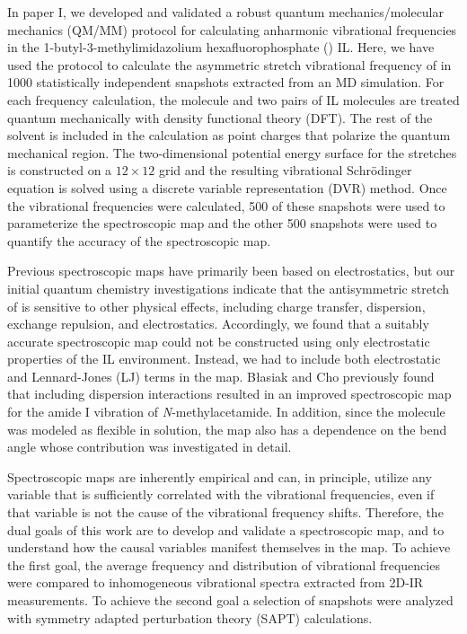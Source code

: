 In paper I\cite{PaperI}, we developed and validated a robust quantum mechanics/molecular mechanics (QM/MM) protocol for calculating anharmonic  vibrational frequencies in the 1-butyl-3-methylimidazolium hexafluorophosphate (\ce{[C4C1im][PF6]}) IL. Here, we have used the protocol to calculate the asymmetric stretch vibrational frequency of  in 1000 statistically independent snapshots extracted from an MD simulation. For each frequency calculation, the  molecule and two pairs of IL molecules are treated quantum mechanically with density functional theory (DFT). The rest of the solvent is included in the calculation as point charges that polarize the quantum mechanical region. The two-dimensional potential energy surface for the  stretches is constructed on a \(12 \times 12\) grid and the resulting vibrational Schrödinger equation is solved using a discrete variable representation (DVR) method. Once the vibrational frequencies were calculated, \num{500} of these snapshots were used to parameterize the spectroscopic map and the other \num{500} snapshots were used to quantify the accuracy of the spectroscopic map.

Previous spectroscopic maps have primarily been based on electrostatics,\cite{choi_vibrational_2011,corcelliJCP-04a,62,63,64,65,66} but our initial quantum chemistry investigations\cite{23,67} indicate that the antisymmetric stretch of  is sensitive to other physical effects, including charge transfer, dispersion, exchange repulsion, and electrostatics. Accordingly, we found that a suitably accurate spectroscopic map could not be constructed using only electrostatic properties of the IL environment. Instead, we had to include both electrostatic and Lennard-Jones (LJ) terms in the map. Błasiak and Cho previously found that including dispersion interactions resulted in an improved spectroscopic map for the amide I vibration of \textit{N}-methylacetamide.\cite{68} In addition, since the  molecule was modeled as flexible in solution, the map also has a dependence on the  bend angle whose contribution was investigated in detail.

Spectroscopic maps are inherently empirical and can, in principle, utilize any variable that is sufficiently correlated with the vibrational frequencies, even if that variable is not the cause of the vibrational frequency shifts. Therefore, the dual goals of this work are to develop and validate a spectroscopic map, and to understand how the causal variables manifest themselves in the map. To achieve the first goal, the average frequency and distribution of vibrational frequencies were compared to inhomogeneous vibrational spectra extracted from 2D-IR measurements. To achieve the second goal a selection of snapshots were analyzed with symmetry adapted perturbation theory (SAPT)\cite{69,70,71} calculations.

